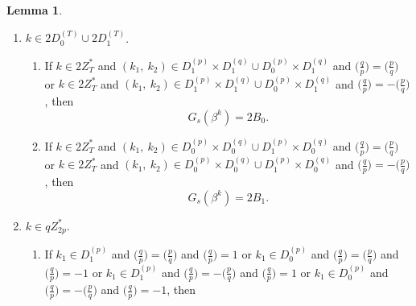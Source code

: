\documentclass{mcom-l}
\theoremstyle{definition}
\newtheorem{sec3lemma10}[sec3lemma1]{Lemma}
\numberwithin{equation}{section}
\begin{document}
\begin{sec3lemma10}
\begin{enumerate}
\begin{enumerate}
\begin{equation*}
    G_{s}(\beta^{k})=(A_{1}-A_{0})(B_{0}-B_{1}-1)-4.
    \end{equation*} 
    \item
    If $ k\in D_{1}^{(2T)} $ and $ (k_{1},\ k_{2})\in D^{(p)}_{1}\times D^{(q)}_{0} $ and $ \biggl(\frac{q}{p}\biggr)=\biggl(\frac{p}{q}\biggr) $ or $ k\in D_{0}^{(2T)} $ and $ (k_{1},\ k_{2})\in D^{(p)}_{1}\times D^{(q)}_{1} $ and $ \biggl(\frac{q}{p}\biggr)=-\biggl(\frac{p}{q}\biggr) $, then
    \begin{equation*}
    G_{s}(\beta^{k})=(A_{1}-A_{0})(B_{0}-B_{1}+1)-4.
    \end{equation*}   
    \end{enumerate}
    \item $ k\in 2D_{0}^{(T)}\cup 2D_{1}^{(T)} $.
    \begin{enumerate}
    \item
    If $ k\in 2Z_{T}^{*} $ and $ (k_{1},\ k_{2})\in D^{(p)}_{1}\times D^{(q)}_{1}\cup  D^{(p)}_{0}\times D^{(q)}_{1}$ and $ \biggl(\frac{q}{p}\biggr)=\biggl(\frac{p}{q}\biggr) $ or $ k\in 2Z_{T}^{*} $ and $ (k_{1},\ k_{2})\in D^{(p)}_{1}\times D^{(q)}_{1}\cup  D^{(p)}_{0}\times D^{(q)}_{1}$ and $ \biggl(\frac{q}{p}\biggr)=-\biggl(\frac{p}{q}\biggr) $, then
    \begin{equation*}
    G_{s}(\beta^{k})=2B_{0}.
    \end{equation*} 
    \item
    If $ k\in 2Z_{T}^{*} $ and $ (k_{1},\ k_{2})\in D^{(p)}_{0}\times D^{(q)}_{0}\cup  D^{(p)}_{1}\times D^{(q)}_{0}$ and $ \biggl(\frac{q}{p}\biggr)=\biggl(\frac{p}{q}\biggr) $ or $ k\in 2Z_{T}^{*} $ and $ (k_{1},\ k_{2})\in D^{(p)}_{0}\times D^{(q)}_{0}\cup  D^{(p)}_{1}\times D^{(q)}_{0}$ and $ \biggl(\frac{q}{p}\biggr)=-\biggl(\frac{p}{q}\biggr) $, then
    \begin{equation*}
    G_{s}(\beta^{k})=2B_{1}.
    \end{equation*}  
    \end{enumerate}
    \item $ k\in qZ^{*}_{2p} $.
    \begin{enumerate}
    \item
    If  $ k_{1}\in D_{1}^{(p)} $ and $ \biggl(\frac{q}{p}\biggr)=\biggl(\frac{p}{q}\biggr) $ and $ \biggl(\frac{q}{p}\biggr)=1 $ or  $ k_{1}\in D_{0}^{(p)} $ and $ \biggl(\frac{q}{p}\biggr)=\biggl(\frac{p}{q}\biggr) $ and $ \biggl(\frac{q}{p}\biggr)=-1 $ or  $ k_{1}\in D_{1}^{(p)} $ and $ \biggl(\frac{q}{p}\biggr)=-\biggl(\frac{p}{q}\biggr) $ and $ \biggl(\frac{q}{p}\biggr)=1 $ or  $ k_{1}\in D_{0}^{(p)} $ and $ \biggl(\frac{q}{p}\biggr)=-\biggl(\frac{p}{q}\biggr) $ and $ \biggl(\frac{q}{p}\biggr)=-1 $, then

\end{enumerate}
\end{enumerate}
\end{sec3lemma10}
\end{document}
